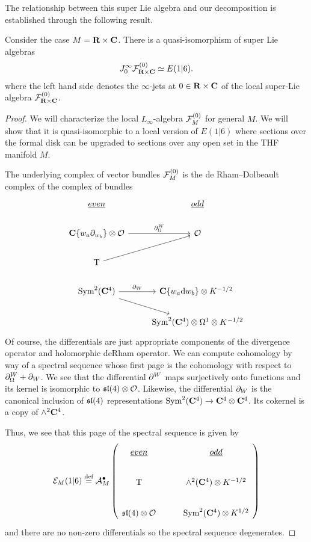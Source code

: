\documentclass[../main.tex]{subfiles}
\begin{document}
The relationship between this super Lie algebra and our decomposition is established through the following result.

\begin{prop}
Consider the case $M = \mathbf{R} \times \mathbf{C}$.
There is a quasi-isomorphism of super Lie algebras
\[
J^\infty_0\mathcal{F}^{(0)}_{\mathbf{R}\times \mathbf{C}} \simeq E(1|6).
\]
where the left hand side denotes the $\infty$-jets at $0\in \mathbf{R}\times \mathbf{C}$ of the local super-Lie algebra $\mathcal{F}^{(0)}_{\mathbf{R}\times \mathbf{C}}$. 
\end{prop}
\begin{proof}
We will characterize the local $L_\infty$-algebra $\mathcal{F}^{(0)}_{M}$ for general $M$. 
We will show that it is quasi-isomorphic to a local version of $E(1|6)$ where sections over the formal disk can be upgraded to sections over any open set in the THF manifold $M$.

The underlying complex of vector bundles $\mathcal{F}^{(0)}_{M}$ is the de Rham--Dolbeault complex of the complex of bundles 
\begin{equation}
\begin{tikzcd}
\ul{even} & \ul{odd} \\
\C\{w_a\del_{w_b}\}\otimes \mc O\ar[r, "\del^W_\Omega"]  & \mc O \\ 
\T \ar[ur] & \\
\Sym^2 (\C^4)\ar[r, "\del_W"]\ar[dr] & \C\{w_a\d w_b\} \otimes K^{-1/2}\ \\
& \Sym^2 (\C^4)\otimes \Omega^1\otimes K^{-1/2}
\end{tikzcd}
\end{equation}
Of course, the differentials are just appropriate components of the divergence operator and holomorphic deRham operator. We can compute cohomology by way of a spectral sequence whose first page is the cohomology with respect to $\partial^W_\Omega + \partial_W$. We see that the differential $\partial^W$ maps surjectively onto functions and its kernel is isomorphic to $\mathfrak{sl}(4)\otimes \mathcal{O}$. Likewise, the differential $\partial_W$ is the canonical inclusion of $\mathfrak{sl}(4)$ representations $\text{Sym}^2 (\mathbf{C}^4)\to \mathbf{C}^4\otimes \mathbf{C}^4$. 
Its cokernel is a copy of $\wedge^2 \mathbf{C}^4$. 

Thus, we see that this page of the spectral sequence is given by
\begin{equation}
\mc E_M(1|6) \define \cA^\bu_M \left (
\begin{tikzcd}
\ul{even} & \ul{odd} \\
\T & \wedge^2 (\C^4) \otimes K^{-1/2} \\
\mf {sl}(4)\otimes \mc O & \Sym^2 (\C^4)\otimes K^{1/2}
\end{tikzcd} \right)
\end{equation}
and there are no non-zero differentials so the spectral sequence degenerates.


\end{proof}
\end{document}
